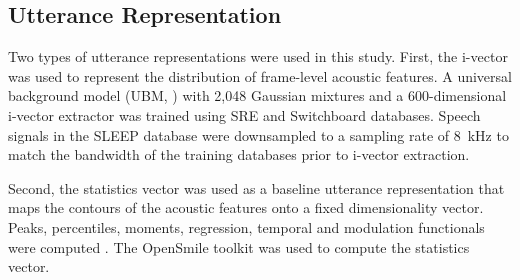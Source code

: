 \subsection{Utterance Representation}
  
Two types of utterance representations were used in this study.
First, the i-vector was used to represent the distribution of frame-level acoustic features. A universal background model (UBM, \cite{Reynolds2000}) with 2,048 Gaussian mixtures and a 600-dimensional i-vector extractor was trained using SRE and Switchboard databases. Speech signals in the SLEEP database were downsampled to a sampling rate of 8~kHz to match the bandwidth of the training databases prior to i-vector extraction. %


Second, 
the statistics vector was used as a baseline utterance representation that maps the contours of the acoustic features onto a fixed dimensionality vector. Peaks, percentiles, moments, regression, temporal and modulation functionals were computed \cite{weninger2013acoustics}. The OpenSmile toolkit \cite{eyben2010opensmile} was used to compute the statistics vector. %